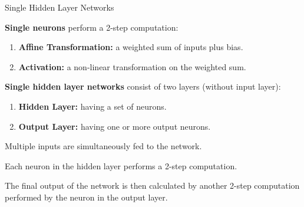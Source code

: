 \documentclass[11pt,compress,t,notes=noshow, xcolor=table]{beamer}
\begin{document}
\begin{framei}{Single Hidden Layer Networks}
\item \textbf{Single neurons} perform a 2-step computation:
\begin{enumerate}
\item \textbf{Affine Transformation:} a weighted sum of inputs plus bias.
\item \textbf{Activation:} a non-linear transformation on the weighted sum.
\end{enumerate}
\vfill
\item \textbf{Single hidden layer networks} consist of two layers (without input layer):
\begin{enumerate}
\item \textbf{Hidden Layer:} having a set of neurons.
\item \textbf{Output Layer:} having one or more output neurons.
\end{enumerate}
\vfill

\item Multiple inputs are simultaneously fed to the network.
\vfill
\item Each neuron in the hidden layer performs a 2-step computation.
\vfill
\item The final output of the network is then calculated by another 2-step computation performed by the neuron in the output layer.

\end{framei}
\end{document}
